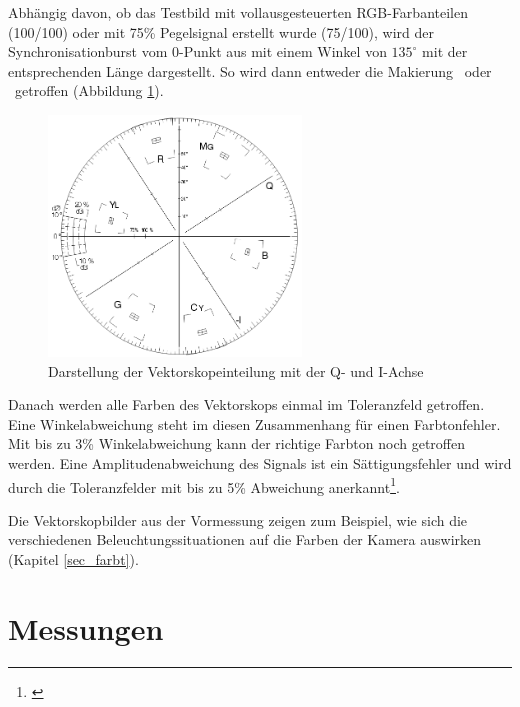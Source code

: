 \noindent Abhängig davon, ob das Testbild mit vollausgesteuerten RGB-Farbanteilen (100/100) oder mit 75\% Pegelsignal erstellt wurde (75/100), wird der Synchronisationburst vom 0-Punkt aus mit einem Winkel von $135^\circ$ mit der entsprechenden Länge dargestellt. So wird dann entweder die Makierung \grqq\ oder \grqq\ getroffen (Abbildung \ref{b_vektorskop}).

\begin{figure}[H]     %
\centering
\includegraphics[width=0.6\textwidth]{bilder/vektorskop} 
\caption {Darstellung der Vektorskopeinteilung mit der Q- und I-Achse\protect\footnotemark}\label{b_vektorskop}
\end{figure}

Danach werden alle Farben des Vektorskops einmal im Toleranzfeld getroffen. Eine Winkelabweichung steht im diesen Zusammenhang für einen Farbtonfehler. Mit bis zu 3\% Winkelabweichung kann der richtige Farbton noch getroffen werden. Eine Amplitudenabweichung des Signals ist ein Sättigungsfehler und wird durch die Toleranzfelder mit bis zu 5\% Abweichung anerkannt\footnote{\cite[114]{schmidt}}.

Die Vektorskopbilder aus der Vormessung zeigen zum Beispiel, wie sich die verschiedenen Beleuchtungssituationen auf die Farben der Kamera auswirken (Kapitel \ref{sec_farbt}).

\chapter{Messungen}



